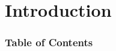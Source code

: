 \documentclass[
	11pt,
]{beamer}
\begin{document}

\section{Introduction} %
\begin{frame}
	\frametitle{Table of Contents}

	\tableofcontents[currentsection]
\end{frame}
\end{document}
